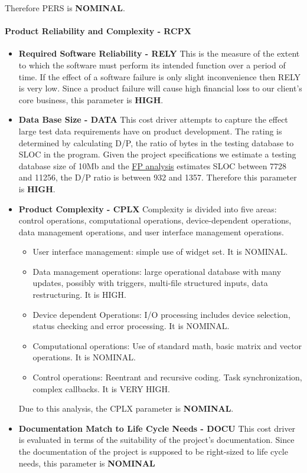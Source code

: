 Therefore PERS is \textbf{NOMINAL}.

\paragraph{Product Reliability and Complexity - RCPX}
\begin{itemize}
	\item \textbf{Required Software Reliability - RELY} This is the measure of the extent to which the software must perform its intended function over a period of time. If the effect of a software failure is only slight inconvenience then RELY is very low. Since a product failure will cause high financial loss to our client's core business, this parameter is \textbf{HIGH}.
	\item \textbf{Data Base Size - DATA} This cost driver attempts to capture the effect large test data requirements have on product development. The rating is determined by calculating D/P, the ratio of bytes in the testing database to SLOC in the program. Given the project specifications we estimate a testing database size of 10Mb and the \hyperref[sec:FPResult]{FP analysis} estimates SLOC between 7728 and 11256, the D/P ratio is between 932 and 1357. Therefore this parameter is \textbf{HIGH}.
	\item \textbf{Product Complexity - CPLX} Complexity is divided into five areas: control operations, computational operations, device-dependent operations, data management operations, and user interface management operations.
	\begin{itemize}
		\item User interface management: simple use of widget set. It is NOMINAL.
		\item Data management operations: large operational database with many updates, possibly with triggers, multi-file structured inputs, data restructuring. It is HIGH.
		\item Device dependent Operations: I/O processing includes device selection, status checking and error processing. It is NOMINAL.
		\item Computational operations: Use of standard math, basic matrix and vector operations. It is NOMINAL.
		\item Control operations: Reentrant and recursive coding. Task synchronization, complex callbacks. It is VERY HIGH.
	\end{itemize}
	Due to this analysis, the CPLX parameter is \textbf{NOMINAL}.
	\item \textbf{Documentation Match to Life Cycle Needs - DOCU} This cost driver is evaluated in terms of the suitability
of the project's documentation. Since the documentation of the project is supposed to be right-sized to life cycle needs, this parameter is \textbf{NOMINAL}
\end{itemize}

